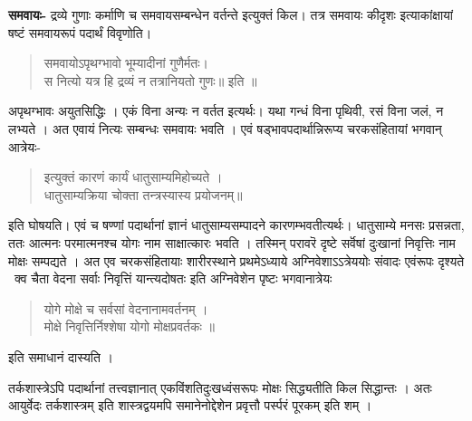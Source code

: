 \textbf{समवायः-} द्रव्ये गुणाः कर्माणि च समवायसम्बन्धेन वर्तन्ते इत्युक्तं किल। तत्र समवायः कीदृशः इत्याकांक्षायां षष्टं समवायरूपं पदार्थं विवृणोति।
\begin{verse}
समवायोऽपृथग्भावो भूम्यादीनां गुणैर्मतः।\\
स नित्यो यत्र हि द्रव्यं न तत्रानियतो गुणः॥ इति ॥
\end{verse}
अपृथग्भावः अयुतसिद्धिः । एकं विना अन्यः न वर्तत इत्यर्थः। यथा गन्धं विना पृथिवी, रसं विना जलं, न लभ्यते । अत एवायं नित्यः सम्बन्धः समवायः भवति । एवं षड्भावपदार्थान्निरूप्य चरकसंहितायां भगवान् आत्रेयः-
\begin{verse}
इत्युक्तं कारणं कार्यं धातुसाम्यमिहोच्यते ।\\
धातुसाम्यक्रिया चोक्ता तन्त्रस्यास्य प्रयोजनम्॥
\end{verse}
इति घोषयति। एवं च षण्णां पदार्थानां ज्ञानं धातुसाम्यसम्पादने कारणम्भवतीत्यर्थः। धातुसाम्ये मनसः प्रसन्नता, ततः आत्मनः परमात्मनश्च योगः नाम साक्षात्कारः भवति । तस्मिन् परावरॆ दृष्टे सर्वॆषां दुःखानां निवृत्तिः नाम मोक्षः सम्पद्यते । अत एव चरकसंहितायाः शारीरस्थाने प्रथमेऽध्याये अग्निवेशाऽऽत्रेययोः संवादः एवंरूपः दृश्यते \ क्व चैता वेदना सर्वाः निवृत्तिं यान्त्यदोषतः इति अग्निवेशेन पृष्टः भगवानात्रेयः
\begin{verse}
योगे मोक्षे च सर्वसां वेदनानामवर्तनम् ।\\
मोक्षे निवृत्तिर्निश्शेषा योगो मोक्षप्रवर्तकः ॥
\end{verse}
इति समाधानं दास्यति ।

तर्कशास्त्रेऽपि पदार्थानां तत्त्वज्ञानात् एकविंशतिदुःखध्वंसरूपः मोक्षः सिद्ध्यतीति किल सिद्धान्तः । अतः आयुर्वेदः तर्कशास्त्रम् इति शास्त्रद्वयमपि समानेनोद्देशेन प्रवृत्तौ पर्स्परं पूरकम् इति शम् ।
